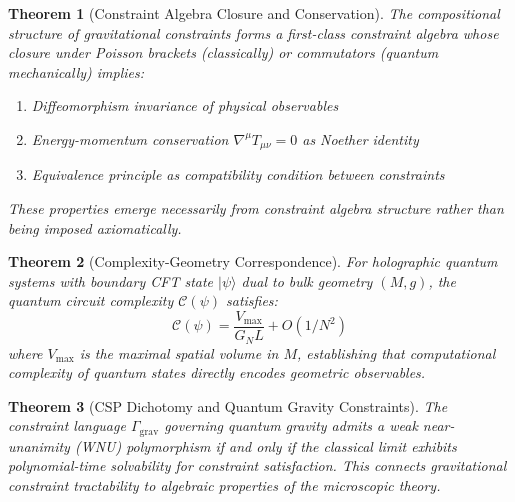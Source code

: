 \documentclass[11pt,a4paper]{article}
\newtheorem{theorem}{Theorem}[section]
\theoremstyle{remark}
\theoremstyle{definition}
\begin{document}
\begin{theorem}[Constraint Algebra Closure and Conservation]
\label{thm:constraint_closure}
The compositional structure of gravitational constraints forms a first-class constraint algebra whose closure under Poisson brackets (classically) or commutators (quantum mechanically) implies:
\begin{enumerate}[label=(\roman*)]
\item Diffeomorphism invariance of physical observables
\item Energy-momentum conservation $\nabla^\mu T_{\mu\nu} = 0$ as Noether identity
\item Equivalence principle as compatibility condition between constraints
\end{enumerate}
These properties emerge necessarily from constraint algebra structure rather than being imposed axiomatically.
\end{theorem}

\begin{theorem}[Complexity-Geometry Correspondence]
\label{thm:complexity_geometry}
For holographic quantum systems with boundary CFT state $|\psi\rangle$ dual to bulk geometry $(M, g)$, the quantum circuit complexity $\mathcal{C}(\psi)$ satisfies:
\begin{equation}
\mathcal{C}(\psi) = \frac{V_{\text{max}}}{G_N L} + O(1/N^2)
\end{equation}
where $V_{\text{max}}$ is the maximal spatial volume in $M$, establishing that computational complexity of quantum states directly encodes geometric observables.
\end{theorem}

\begin{theorem}[CSP Dichotomy and Quantum Gravity Constraints]
\label{thm:csp_dichotomy}
The constraint language $\Gamma_{\text{grav}}$ governing quantum gravity admits a weak near-unanimity (WNU) polymorphism if and only if the classical limit exhibits polynomial-time solvability for constraint satisfaction. This connects gravitational constraint tractability to algebraic properties of the microscopic theory.
\end{theorem}
\end{document}
